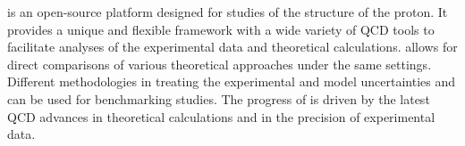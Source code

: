 
\label{sec:summary}
\fitter is an open-source platform designed for studies of the structure of the proton.
It provides a unique and flexible framework with a wide variety of QCD tools to 
facilitate analyses of the experimental data and theoretical calculations. 
\fitter allows for direct comparisons of various theoretical approaches under the same settings. 
Different methodologies in treating the experimental and model uncertainties and can be used for benchmarking studies.
The progress of \fitter is driven by the latest QCD advances in theoretical calculations and in the precision of experimental data.


